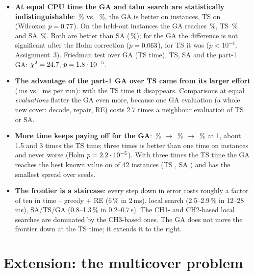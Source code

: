\documentclass[11pt,a4paper]{article}
\begin{document}
\begin{itemize}
\item \textbf{At equal CPU time the GA and tabu search are statistically indistinguishable}: \devGAshort\,\% vs.\ \devTS\,\%, the GA is better on \pwTSAbetter{} instances, TS on \pwTSBbetter{} (Wilcoxon $p=0.77$). On the held-out instances the GA reaches \heldGAshort\,\%, TS \heldTS\,\% and SA \heldSA\,\%. Both are better than SA (\devSA\,\%); for the GA the difference is not significant after the Holm correction ($p=0.063$), for TS it was ($p<10^{-4}$, Assignment~3). Friedman test over GA (TS time), TS, SA and the part-1 GA: $\chi^2=24.7$, $p=1.8\cdot10^{-5}$.
\item \textbf{The advantage of the part-1 GA over TS came from its larger effort} (\cpuGAbase\,ms vs.\ \cpuTS\,ms per run): with the TS time it disappears. Comparisons at equal \emph{evaluations} flatter the GA even more, because one GA evaluation (a whole new cover: decode, repair, RE) costs 2.7 times a neighbour evaluation of TS or SA.
\item \textbf{More time keeps paying off for the GA}: \devGAshort\,\% $\to$ \devGAbase\,\% $\to$ \devGAlong\,\% at 1, about 1.5 and 3 times the TS time; three times is better than one time on \pwLongAbetter{} instances and never worse (Holm $p=2.2\cdot10^{-5}$). With three times the TS time the GA reaches the best known value on \hitGAlong{} of 42 instances (TS \hitTS, SA \hitSA) and has the smallest spread over seeds.
\item \textbf{The frontier is a staircase}: every step down in error costs roughly a factor of ten in time -- greedy + RE (6\,\% in 2\,ms), local search (2.5--2.9\,\% in 12--28\,ms), SA/TS/GA (0.8--1.3\,\% in 0.2--0.7\,s). The CH1- and CH2-based local searches are dominated by the CH3-based ones. The GA does not move the frontier down at the TS time; it extends it to the right.
\end{itemize}

\section{Extension: the multicover problem}\label{sec:multicover}
\end{document}
